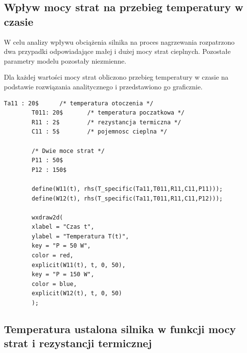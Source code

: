 \documentclass[a4paper,12pt]{article}
\begin{document}
	
	
	
	
	\subsection{Wpływ mocy strat na przebieg temperatury w czasie}
	
	W celu analizy wpływu obciążenia silnika na proces nagrzewania
	rozpatrzono dwa przypadki odpowiadające małej i dużej mocy strat cieplnych.
	Pozostałe parametry modelu pozostały niezmienne.
	
	Dla każdej wartości mocy strat obliczono przebieg temperatury w czasie
	na podstawie rozwiązania analitycznego i przedstawiono go graficznie.
	
	\begin{lstlisting}[caption={Definicja parametrów i wykres temperatury w czasie}]
		Ta11 : 20$      /* temperatura otoczenia */
		T011: 20$       /* temperatura poczatkowa */
		R11 : 2$        /* rezystancja termiczna */
		C11 : 5$        /* pojemnosc cieplna */
		
		/* Dwie moce strat */
		P11 : 50$
		P12 : 150$
		
		define(W11(t), rhs(T_specific(Ta11,T011,R11,C11,P11)));
		define(W12(t), rhs(T_specific(Ta11,T011,R11,C11,P12)));
		
		wxdraw2d(
		xlabel = "Czas t",
		ylabel = "Temperatura T(t)",
		key = "P = 50 W",
		color = red,
		explicit(W11(t), t, 0, 50),
		key = "P = 150 W",
		color = blue,
		explicit(W12(t), t, 0, 50)
		);
	\end{lstlisting}
	
	
	
	\subsection{Temperatura ustalona silnika w funkcji mocy strat i rezystancji termicznej}
	
\end{document}
